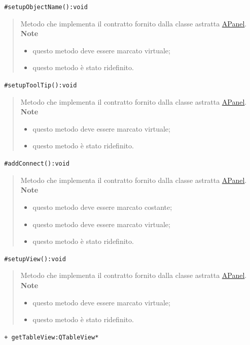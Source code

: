 \color{blue}\verb! #setupObjectName():void!
\begin{quote}
\color{black}Metodo che implementa il contratto fornito dalla classe astratta \hyperref[speAPanel]{APanel}.\\
 \textbf{Note}
 \begin{itemize}
  \item questo metodo deve essere marcato virtuale;
 \item questo metodo è stato ridefinito.
 \end{itemize}
\end{quote} 
\color{blue}\verb! #setupToolTip():void!
\begin{quote}
\color{black}Metodo che implementa il contratto fornito dalla classe astratta \hyperref[speAPanel]{APanel}.\\
 \textbf{Note}
 \begin{itemize}
 \item questo metodo deve essere marcato virtuale;
 \item questo metodo è stato ridefinito.
 \end{itemize}
\end{quote} 
\color{blue}\verb! #addConnect():void!
\begin{quote}
\color{black}Metodo che implementa il contratto fornito dalla classe astratta \hyperref[speAPanel]{APanel}.\\
 \textbf{Note}
 \begin{itemize}
 \item questo metodo deve essere marcato costante;
 \item questo metodo deve essere marcato virtuale;
 \item questo metodo è stato ridefinito.
 \end{itemize}
\end{quote} 
\color{blue}\verb! #setupView():void!
\color{black}
\begin{quote}
Metodo che implementa il contratto fornito dalla classe astratta \hyperref[speAPanel]{APanel}.\\
 \textbf{Note}
 \begin{itemize}
 \item questo metodo deve essere marcato virtuale;
 \item questo metodo è stato ridefinito.
 \end{itemize}
\end{quote}
\color{blue}\verb! + getTableView:QTableView*!
\color{black} 
